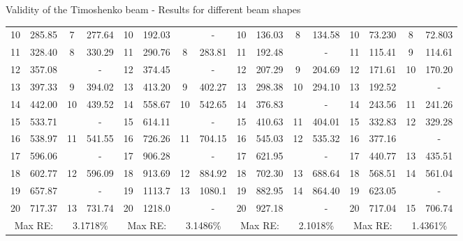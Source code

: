 \documentclass[8pt]{beamer}
\begin{document}
\begin{frame}{Validity of the Timoshenko beam - Results for different beam shapes}
{\begin{tabular}{|cccc||cccc||cccc||cccc|}
                {10} & 285.85 & 7     & 277.64 & {10}    & {192.03} &      & {-} & 10    & 136.03 & 8     & 134.58 & 10    & 73.230 & 8     & 72.803 \\
                {11} & 328.40 & 8     & 330.29 & 11    & 290.76 & 8     & 283.81 & {11}    & {192.48} &       & {-} & 11    & 115.41 & 9     & 114.61 \\
                {12} & {357.08} &       & {-} & {12}    & {374.45} &       & {-} & 12    & 207.29 & 9     & 204.69 & 12    & 171.61 & 10    & 170.20 \\
                {13} & 397.33 & 9     & 394.02 & 13    & 413.20 & 9     & 402.27 & 13    & 298.38 & 10    & 294.10 & {13}    & {192.52} &       & {-} \\
                {14} & 442.00   & 10    & 439.52 & 14    & 558.67 & 10    & 542.65 & {14}    & {376.83} &       & {-} & 14    & 243.56 & 11    & 241.26 \\
                {15} & {533.71} &       & {-} & {15}    & {614.11} &       & {-} & 15    & 410.63 & 11    & 404.01 & 15    & 332.83 & 12    & 329.28 \\
                {16} & 538.97 & 11    & 541.55 & 16    & 726.26 & 11    & 704.15 & 16    & 545.03 & 12    & 535.32 & {16}    & {377.16} &       & {-} \\
                {17} & {596.06} &       & {-} & {17}    & {906.28} &       & {-} & {17}    & {621.95} &       & {-} & 17    & 440.77 & 13    & 435.51 \\
                {18} & 602.77 & 12    & 596.09 & 18    & 913.69 & 12    & 884.92 & 18    & 702.30 & 13    & 688.64 & 18    & 568.51 & 14    & 561.04 \\
                {19} & {657.87} &       & {-} & 19    & 1113.7 & 13    & 1080.1 & 19    & 882.95 & 14    & 864.40 & {19}    & {623.05} &       & {-} \\
                {20} & 717.37 & 13    & 731.74 & {20}    & {1218.0}  &       & {-} & {20}    & {927.18} &       & {-} & 20    & 717.04 & 15    & 706.74 \\
                \hline
                \multicolumn{2}{|c}{Max RE:} & \multicolumn{2}{c||}{3.1718\%} & \multicolumn{2}{c}{Max RE:} & \multicolumn{2}{c||}{3.1486\%} & \multicolumn{2}{c}{Max RE:} & \multicolumn{2}{c||}{2.1018\%} & \multicolumn{2}{c}{Max RE:} & \multicolumn{2}{c|}{1.4361\%} \\
                \hline
            \end{tabular}}


\end{frame}
\end{document}
